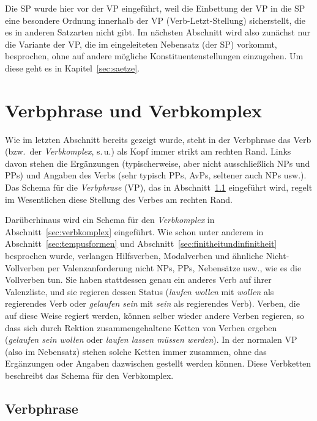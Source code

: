 Die SP wurde hier vor der VP eingeführt, weil die Einbettung der VP in die SP eine besondere Ordnung innerhalb der VP (Verb-Letzt-Stellung) sicherstellt, die es in anderen Satzarten nicht gibt.
Im nächsten Abschnitt wird also zunächst nur die Variante der VP, die im eingeleiteten Nebensatz (der SP) vorkommt, besprochen, ohne auf andere mögliche Konstituentenstellungen einzugehen.
Um diese geht es in Kapitel~\ref{sec:saetze}.



\section{Verbphrase und Verbkomplex}
\label{sec:verbphraseundverbkomplex}

Wie im letzten Abschnitt bereits gezeigt wurde, steht in der Verbphrase das Verb (bzw.\ der \textit{Verbkomplex}, s.\,u.) als Kopf immer strikt am rechten Rand.
Links davon stehen die Ergänzungen (typischerweise, aber nicht ausschließlich NPs und PPs) und Angaben des Verbs (sehr typisch \zB PPs, AvPs, seltener auch NPs usw.).
Das Schema für die \textit{Verbphrase} (VP), das in Abschnitt~\ref{sec:verbphrase} eingeführt wird, regelt im Wesentlichen diese Stellung des Verbes am rechten Rand.

Darüberhinaus wird ein Schema für den \textit{Verbkomplex} in Abschnitt~\ref{sec:verbkomplex} eingeführt.
Wie schon unter anderem in Abschnitt~\ref{sec:tempusformen} und Abschnitt~\ref{sec:finitheitundinfinitheit} besprochen wurde, verlangen Hilfsverben, Modalverben und ähnliche Nicht-Vollverben per Valenzanforderung nicht NPs, PPs, Nebensätze usw., wie es die Vollverben tun.
Sie haben stattdessen genau ein anderes Verb auf ihrer Valenzliste, und sie regieren dessen Status (\zB \textit{laufen wollen} mit \textit{wollen} als regierendes Verb oder \textit{gelaufen sein} mit \textit{sein} als regierendes Verb).
Verben, die auf diese Weise regiert werden, können selber wieder andere Verben regieren, so dass sich durch Rektion zusammengehaltene Ketten von Verben ergeben (\zB \textit{gelaufen sein wollen} oder \textit{laufen lassen müssen werden}).
In der normalen VP (also im Nebensatz) stehen solche Ketten immer zusammen, ohne das Ergänzungen oder Angaben dazwischen gestellt werden können.
Diese Verbketten beschreibt das Schema für den Verbkomplex.

\subsection{Verbphrase}
\label{sec:verbphrase}

